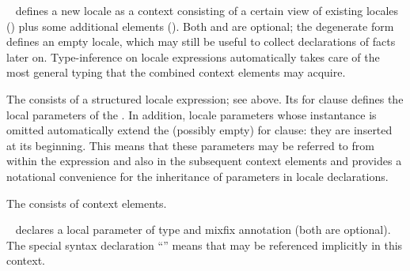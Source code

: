 \begin{isabellebody}
\begin{isamarkuptext}
  \begin{description}
  
  \item \hyperlink{command.locale}{\mbox{}}~ defines a
  new locale  as a context consisting of a certain view of
  existing locales () plus some additional elements
  ().  Both  and  are optional;
  the degenerate form \hyperlink{command.locale}{\mbox{}}~ defines an empty
  locale, which may still be useful to collect declarations of facts
  later on.  Type-inference on locale expressions automatically takes
  care of the most general typing that the combined context elements
  may acquire.

  The  consists of a structured locale expression; see
   above.  Its for clause defines the local
  parameters of the .  In addition, locale parameters
  whose instantance is omitted automatically extend the (possibly
  empty) for clause: they are inserted at its beginning.  This means
  that these parameters may be referred to from within the expression
  and also in the subsequent context elements and provides a
  notational convenience for the inheritance of parameters in locale
  declarations.

  The  consists of context elements.

  \begin{description}

  \item \hyperlink{element.fixes}{\mbox{}}~ declares a local
  parameter of type  and mixfix annotation  (both
  are optional).  The special syntax declaration ``'' means that  may be referenced
  implicitly in this context.


\end{description}
\end{description}
\end{isamarkuptext}
\end{isabellebody}
